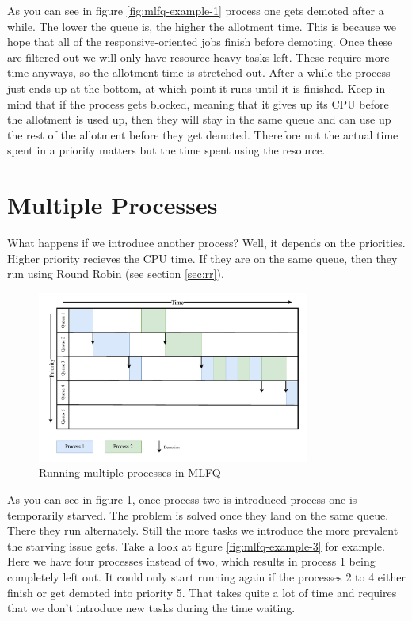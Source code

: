 As you can see in figure \ref{fig:mlfq-example-1} process one gets demoted after a while.
The lower the queue is, the higher the allotment time. 
This is because we hope that all of the responsive-oriented jobs finish before demoting.
Once these are filtered out we will only have resource heavy tasks left.
These require more time anyways, so the allotment time is stretched out.
After a while the process just ends up at the bottom, at which point it runs until it is finished.
Keep in mind that if the process gets blocked, meaning that it gives up its CPU before the allotment is used up, then they will stay in the same queue and can use up the rest of the allotment before they get demoted. Therefore not the actual time spent in a priority matters but the time spent using the resource.

\section{Multiple Processes}

What happens if we introduce another process?
Well, it depends on the priorities. 
Higher priority recieves the CPU time.
If they are on the same queue, then they run using Round Robin (see section \ref{sec:rr}).


\begin{figure}[h]
    \centering
    \includegraphics[width=0.8\textwidth]{Assets/MLFQ-Example-2.pdf}
    \caption{Running multiple processes in MLFQ}
    \label{fig:mlfq-example-2}
\end{figure}

As you can see in figure \ref{fig:mlfq-example-2}, once process two is introduced process one is temporarily starved. The problem is solved once they land on the same queue.
There they run alternately.
Still the more tasks we introduce the more prevalent the starving issue gets.
Take a look at figure \ref{fig:mlfq-example-3} for example. 
Here we have four processes instead of two, which results in process 1 being completely left out.
It could only start running again if the processes 2 to 4 either finish or get demoted into priority 5.
That takes quite a lot of time and requires that we don't introduce new tasks during the time waiting.

